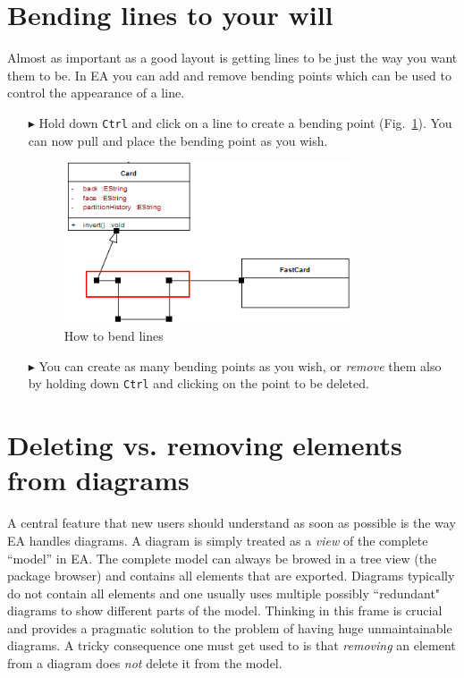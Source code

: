 \section{Bending lines to your will}

Almost as important as a good layout is getting lines to be just the way you want them to be.
In EA you can add and remove bending points which can be used to control the appearance of a line.

\begin{enumerate}
\item[$\blacktriangleright$]Hold down \texttt{Ctrl} and click on a line to create a bending point (Fig.~\ref{fig_bendLine01}).
You can now pull and place the bending point as you wish.
 
\begin{figure}[htbp]
\begin{center}
  \includegraphics[width=0.8\textwidth]{pics/tricks/bendLine/bendLine1}
  \caption{How to bend lines}   
  \label{fig_bendLine01}
\end{center}
\end{figure}

\item[$\blacktriangleright$] You can create as many bending points as you wish, or \emph{remove} them also by holding down \texttt{Ctrl} and clicking on the point to be deleted.
\end{enumerate}

\section{Deleting vs. removing elements from diagrams}

A central feature that new users should understand as soon as possible is the way EA handles diagrams.
A diagram is simply treated as a \emph{view} of the complete ``model'' in EA.
The complete model can always be browed in a tree view (the package browser) and contains all elements that are exported.
Diagrams typically do not contain all elements and one usually uses multiple possibly ``redundant" diagrams to show different parts of the model.
Thinking in this frame is crucial and provides a pragmatic solution to the problem of having huge unmaintainable diagrams.
A tricky consequence one must get used to is that \emph{removing} an element from a diagram does \emph{not} delete it from the model.

